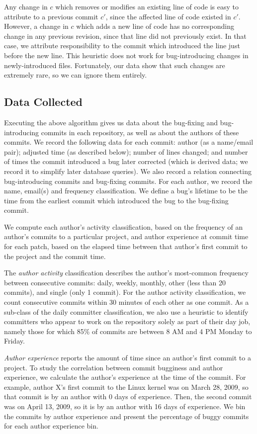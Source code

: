 Any change in $c$ which removes or modifies an existing line of code is easy to
attribute to a previous commit $c'$, since the affected line of code existed in
$c'$. However, a change in $c$ which adds a new line of code has no
corresponding change in any previous revision, since that line did not
previously exist. In that case, we attribute responsibility to the commit which
introduced the line just before the new line. This heuristic does not work for
bug-introducing changes in newly-introduced files. Fortunately, our data show
that such changes are extremely rare, so we can ignore them entirely.

\subsection{Data Collected}
\label{sec:data}

Executing the above algorithm gives us data about the bug-fixing and
bug-introducing commits in each repository, as well as about the authors of
these commits.  We record the following data for each commit: author (as a
name/email pair); adjusted time (as described below); number of lines changed;
and number of times the commit introduced a bug later corrected (which is
derived data; we record it to simplify later database queries). We also record a
relation connecting bug-introducing commits and bug-fixing commits. For each
author, we record the name, email(s) and frequency classification. We define a
bug's lifetime to be the time from the earliest commit which introduced the bug
to the bug-fixing commit.

We compute each author's activity classification, based on the frequency of an
author's commits to a particular project, and author experience at commit time
for each patch, based on the elapsed time between that author's first commit to
the project and the commit time.

The {\em author activity} classification describes the author's most-common
frequency between consecutive commits: daily, weekly, monthly, other (less than
20 commits), and single (only 1 commit). For the author activity classification,
we count consecutive commits within 30 minutes of each other as one commit. As a
sub-class of the daily committer classification, we also use a heuristic to
identify committers who appear to work on the repository solely as part of their
day job, namely those for which 85\% of commits are between 8 AM and 4 PM Monday
to Friday.

{\em Author experience} reports the amount of time since an author's first
commit to a project. To study the correlation between commit bugginess and
author experience, we calculate the author's experience at the time of the
commit.  For example, author X's first commit to the Linux kernel was on March
28, 2009, so that commit is by an author with 0 days of experience. Then, the
second commit was on April 13, 2009, so it is by an author with 16 days of
experience. We bin the commits by author experience and present the percentage
of buggy commits for each author experience bin.
 
